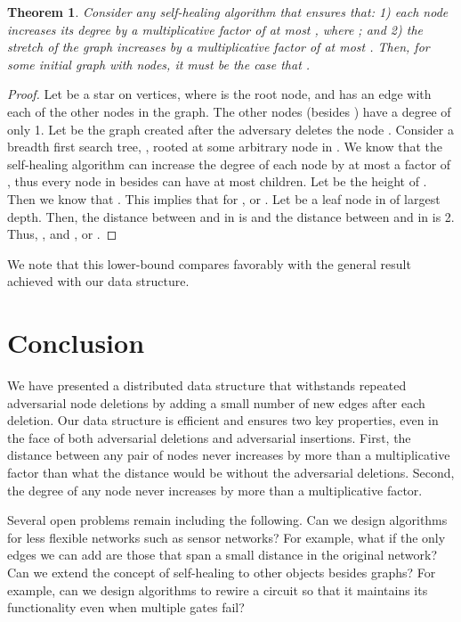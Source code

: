 \documentclass[11pt, letter]{article}
\newtheorem{theorem}{Theorem}
\begin{document}
\label{subsec: lowerbounds}

\begin{theorem}
Consider any self-healing algorithm that ensures that: 1) each node increases its degree by a multiplicative factor of 
at most , where ; and 2) the stretch of the graph
increases by a multiplicative factor of at most . Then, for some initial graph with  nodes, it must be the case that
 .
\end{theorem}

\begin{proof}
Let  be a star on  vertices, where  is the root node, and  has an edge with each of the
other nodes in the graph. The other nodes (besides ) have a degree of only 1. Let  be the graph created after the
adversary deletes the node .  Consider a breadth
first search tree, , rooted at some arbitrary node  in .  We know that the self-healing algorithm can increase
the degree of each node by at most a factor of , thus every node in  besides  can have at most 
children. 
Let  be the height of .  Then we know that .  This implies that   for , or .  Let  be a leaf node in  of largest depth. Then, the distance between  and  in  is  and the distance 
between  and  in  is 2. Thus, , and  , or . 
\end{proof}
\noindent
We note that this lower-bound compares favorably with the general
result achieved with our data structure.  


\section{Conclusion}
We have presented a distributed data structure that withstands
repeated adversarial node deletions by adding a small number of new
edges after each deletion.  Our data structure is efficient and ensures two key
properties, even in the face of both adversarial deletions and adversarial insertions.
First, the distance between any pair of nodes never increases by more than a  multiplicative factor than what the distance would be without the adversarial deletions.  Second, the degree of any node never increases by more than a  multiplicative factor.

Several open problems remain including the following. Can we design algorithms
for less flexible networks such as sensor networks?  For example, what
if the only edges we can add are those that span a small distance in
the original network?  Can we extend the concept of
self-healing to other objects besides graphs?  For example, can we
design algorithms to rewire a circuit so that it maintains its
functionality even when multiple gates fail?
\end{document}
